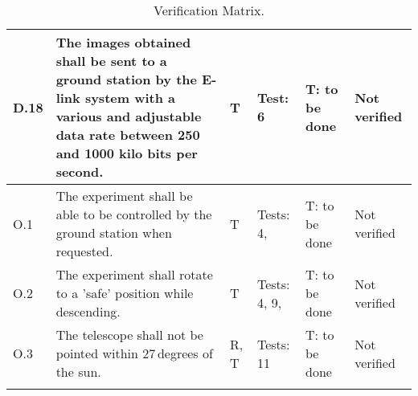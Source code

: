 \begin{longtable}[]{|m{}| m{}|m{}|m{}|m{}|m{}|}
  D.18 & The images obtained shall be sent to a ground station by the E-link system with a various and adjustable data rate between 250 and 1000 kilo bits per second.
& T & Test: 6 & T: to be done & Not verified \\\hline




O.1 & The experiment shall be able to be controlled by the ground station when requested.
& T & Tests: 4, & T: to be done & Not verified \\\hline

O.2 & The experiment shall rotate to a 'safe' position while descending.
& T & Tests: 4, 9,  & T: to be done & Not verified \\\hline

 O.3 & The telescope shall not be pointed within 27\,degrees of the sun.
& R, T & Tests: 11 & T: to be done & Not verified \\\hline

\caption{Verification Matrix.}
\label{tab:var-mat}
\end{longtable}
\raggedbottom
